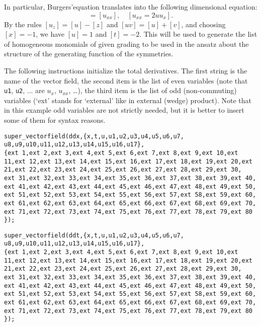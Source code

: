 \documentclass[12pt]{amsart}
\theoremstyle{definition}
\begin{document}
In particular, Burgers'equation translates into the following dimensional
equation:
\begin{displaymath}
  [u_t]=[u_{xx}],\quad [u_{xx}=2uu_x].
\end{displaymath}
By the rules $[u_z]=[u]-[z]$ and $[uv]=[u]+[v]$, and choosing $[x]=-1$, we have
$[u]=1$ and $[t]=-2$. This will be used to generate the list of homogeneous
monomials of given grading to be used in the ansatz about the structure of the
generating function of the symmetries.

The following instructions initialize the total derivatives. The first string
is the name of the vector field, the second item is the list of even variables
(note that \texttt{u1}, \texttt{u2}, ... are $u_x$, $u_{xx}$, \dots), the third
item is the list of odd (non-commuting) variables (`ext' stands for `external'
like in external (wedge) product). Note that in this example odd variables are
not strictly needed, but it is better to insert some of them for syntax reasons.
\begin{verbatim}
super_vectorfield(ddx,{x,t,u,u1,u2,u3,u4,u5,u6,u7,
u8,u9,u10,u11,u12,u13,u14,u15,u16,u17},
{ext 1,ext 2,ext 3,ext 4,ext 5,ext 6,ext 7,ext 8,ext 9,ext 10,ext
11,ext 12,ext 13,ext 14,ext 15,ext 16,ext 17,ext 18,ext 19,ext 20,ext
21,ext 22,ext 23,ext 24,ext 25,ext 26,ext 27,ext 28,ext 29,ext 30,
ext 31,ext 32,ext 33,ext 34,ext 35,ext 36,ext 37,ext 38,ext 39,ext 40,
ext 41,ext 42,ext 43,ext 44,ext 45,ext 46,ext 47,ext 48,ext 49,ext 50,
ext 51,ext 52,ext 53,ext 54,ext 55,ext 56,ext 57,ext 58,ext 59,ext 60,
ext 61,ext 62,ext 63,ext 64,ext 65,ext 66,ext 67,ext 68,ext 69,ext 70,
ext 71,ext 72,ext 73,ext 74,ext 75,ext 76,ext 77,ext 78,ext 79,ext 80
});
\end{verbatim}

\begin{verbatim}
super_vectorfield(ddt,{x,t,u,u1,u2,u3,u4,u5,u6,u7,
u8,u9,u10,u11,u12,u13,u14,u15,u16,u17},
{ext 1,ext 2,ext 3,ext 4,ext 5,ext 6,ext 7,ext 8,ext 9,ext 10,ext
11,ext 12,ext 13,ext 14,ext 15,ext 16,ext 17,ext 18,ext 19,ext 20,ext
21,ext 22,ext 23,ext 24,ext 25,ext 26,ext 27,ext 28,ext 29,ext 30,
ext 31,ext 32,ext 33,ext 34,ext 35,ext 36,ext 37,ext 38,ext 39,ext 40,
ext 41,ext 42,ext 43,ext 44,ext 45,ext 46,ext 47,ext 48,ext 49,ext 50,
ext 51,ext 52,ext 53,ext 54,ext 55,ext 56,ext 57,ext 58,ext 59,ext 60,
ext 61,ext 62,ext 63,ext 64,ext 65,ext 66,ext 67,ext 68,ext 69,ext 70,
ext 71,ext 72,ext 73,ext 74,ext 75,ext 76,ext 77,ext 78,ext 79,ext 80
});
\end{verbatim}
\end{document}
